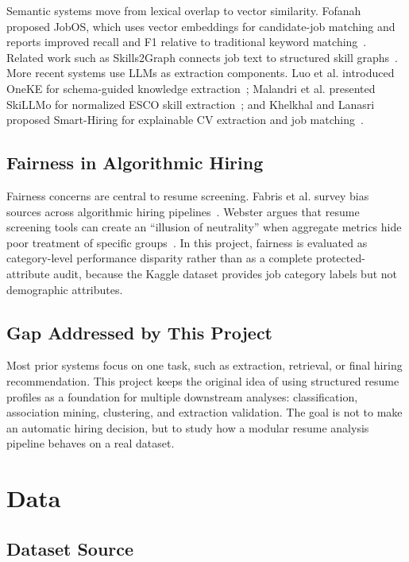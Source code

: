\documentclass[sigconf, authorversion, nonacm]{acmart}
\begin{document}
Semantic systems move from lexical overlap to vector similarity. Fofanah proposed JobOS, which uses vector embeddings for candidate-job matching and reports improved recall and F1 relative to traditional keyword matching~\cite{fofanah2026}. Related work such as Skills2Graph connects job text to structured skill graphs~\cite{giabelli2021}. More recent systems use LLMs as extraction components. Luo et al. introduced OneKE for schema-guided knowledge extraction~\cite{luo2025}; Malandri et al. presented SkiLLMo for normalized ESCO skill extraction~\cite{malandri2025}; and Khelkhal and Lanasri proposed Smart-Hiring for explainable CV extraction and job matching~\cite{khelkhal2025}.

\subsection{Fairness in Algorithmic Hiring}

Fairness concerns are central to resume screening. Fabris et al. survey bias sources across algorithmic hiring pipelines~\cite{fabris2025}. Webster argues that resume screening tools can create an ``illusion of neutrality'' when aggregate metrics hide poor treatment of specific groups~\cite{webster2025}. In this project, fairness is evaluated as category-level performance disparity rather than as a complete protected-attribute audit, because the Kaggle dataset provides job category labels but not demographic attributes.

\subsection{Gap Addressed by This Project}

Most prior systems focus on one task, such as extraction, retrieval, or final hiring recommendation. This project keeps the original idea of using structured resume profiles as a foundation for multiple downstream analyses: classification, association mining, clustering, and extraction validation. The goal is not to make an automatic hiring decision, but to study how a modular resume analysis pipeline behaves on a real dataset.

\section{Data}

\subsection{Dataset Source}
\end{document}
